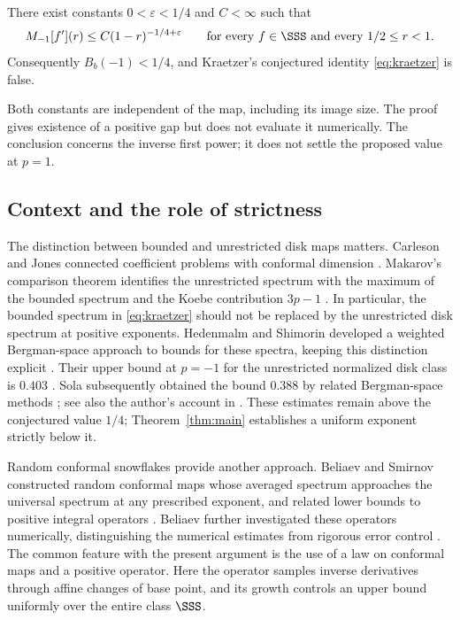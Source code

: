 \begin{theorem}\label{thm:main}
There exist constants \(0<\varepsilon<1/4\) and \(C<\infty\) such that
\begin{equation}\label{eq:uniform}
 M_{-1}[f'](r)\le C(1-r)^{-1/4+\varepsilon}
 \qquad\text{for every }f\in\SSS\text{ and every }1/2\le r<1.
\end{equation}
Consequently \(B_b(-1)<1/4\), and Kraetzer's conjectured identity
\eqref{eq:kraetzer} is false.
\end{theorem}

Both constants are independent of the map, including its image size.
The proof gives existence of a positive gap but does not evaluate it
numerically. The conclusion concerns the inverse first power; it does
not settle the proposed value at \(p=1\).

\subsection{Context and the role of strictness}

The distinction between bounded and unrestricted disk maps matters.
Carleson and Jones connected coefficient problems with conformal
dimension \cite{CJ}. Makarov's comparison theorem identifies the
unrestricted spectrum with the maximum of the bounded spectrum and
the Koebe contribution \(3p-1\) \cite[Theorem 5.4]{Makarov}.
In particular, the bounded spectrum in \eqref{eq:kraetzer} should
not be replaced by the unrestricted disk spectrum at positive exponents.
Hedenmalm and Shimorin developed a weighted Bergman-space approach
to bounds for these spectra, keeping this distinction explicit
\cite{HedenmalmShimorin}. Their upper bound at \(p=-1\) for the
unrestricted normalized disk class is \(0.403\)
\cite[Table 1]{HedenmalmShimorin}. Sola subsequently obtained the
bound \(0.388\) by related Bergman-space methods
\cite{Sola}; see also the author's account in
\cite[p.~6]{SolaThesis}. These estimates remain above the
conjectured value \(1/4\); Theorem~\ref{thm:main} establishes a
uniform exponent strictly below it.

Random conformal snowflakes provide another approach. Beliaev and
Smirnov constructed random conformal maps whose averaged spectrum
approaches the universal spectrum at any prescribed exponent, and
related lower bounds to positive integral operators
\cite[Sections 3--4]{BeliaevSmirnov}. Beliaev further investigated
these operators numerically, distinguishing the numerical estimates
from rigorous error control \cite{Beliaev}. The common feature with
the present argument is the use of a law on conformal maps and a
positive operator. Here the operator samples inverse derivatives
through affine changes of base point, and its growth controls an
upper bound uniformly over the entire class \(\SSS\).

